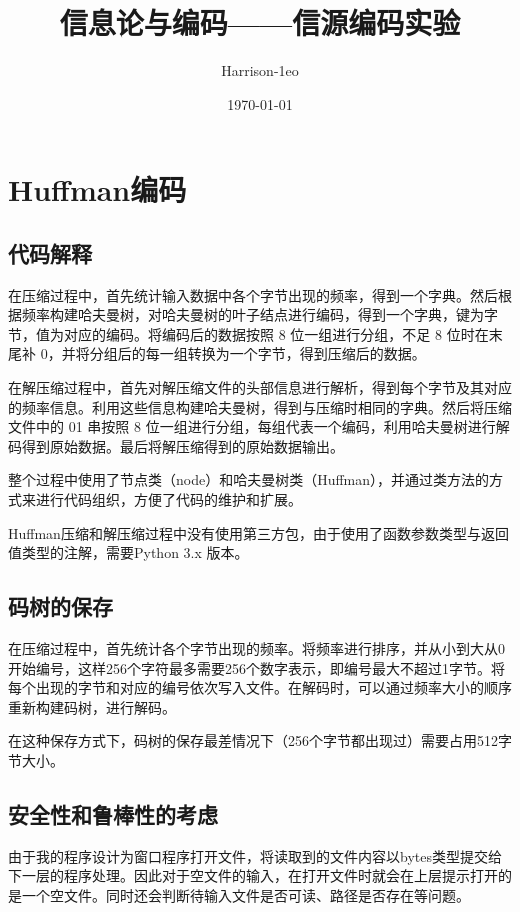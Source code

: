 \documentclass[12pt, a4paper]{ctexart}
\begin{document}
    
    \title {\textbf{信息论与编码——信源编码实验}}
    \author{Harrison-1eo}
    \date{\today}
    \maketitle

\section{Huffman编码}
    \subsection{代码解释}
    在压缩过程中，首先统计输入数据中各个字节出现的频率，得到一个字典。然后根据频率构建哈夫曼树，对哈夫曼树的叶子结点进行编码，得到一个字典，键为字节，值为对应的编码。将编码后的数据按照 8 位一组进行分组，不足 8 位时在末尾补 0，并将分组后的每一组转换为一个字节，得到压缩后的数据。
    
    在解压缩过程中，首先对解压缩文件的头部信息进行解析，得到每个字节及其对应的频率信息。利用这些信息构建哈夫曼树，得到与压缩时相同的字典。然后将压缩文件中的 01 串按照 8 位一组进行分组，每组代表一个编码，利用哈夫曼树进行解码得到原始数据。最后将解压缩得到的原始数据输出。
    
    整个过程中使用了节点类（node）和哈夫曼树类（Huffman），并通过类方法的方式来进行代码组织，方便了代码的维护和扩展。

    Huffman压缩和解压缩过程中没有使用第三方包，由于使用了函数参数类型与返回值类型的注解，需要Python 3.x 版本。

    \subsection{码树的保存}
    在压缩过程中，首先统计各个字节出现的频率。将频率进行排序，并从小到大从0开始编号，这样256个字符最多需要256个数字表示，即编号最大不超过1字节。将每个出现的字节和对应的编号依次写入文件。在解码时，可以通过频率大小的顺序重新构建码树，进行解码。

    在这种保存方式下，码树的保存最差情况下（256个字节都出现过）需要占用512字节大小。

    \subsection{安全性和鲁棒性的考虑}
    由于我的程序设计为窗口程序打开文件，将读取到的文件内容以bytes类型提交给下一层的程序处理。因此对于空文件的输入，在打开文件时就会在上层提示打开的是一个空文件。同时还会判断待输入文件是否可读、路径是否存在等问题。
\end{document}
